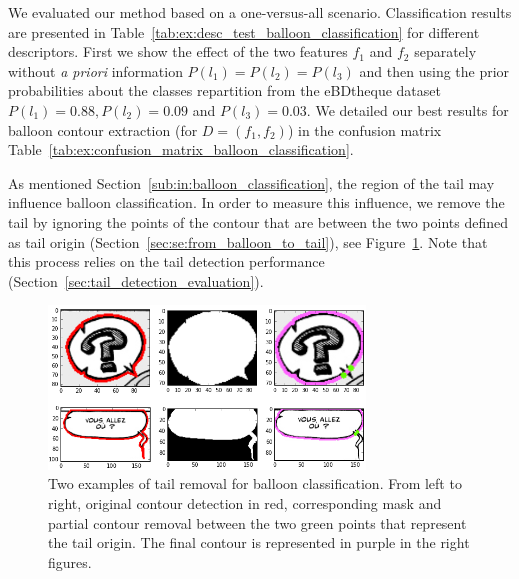 We evaluated our method based on a one-versus-all scenario.
Classification results are presented in Table~\ref{tab:ex:desc_test_balloon_classification} for different descriptors.
First we show the effect of the two features $f_1$ and $f_2$ separately without \emph{a priori} information $P(l_1)=P(l_2)=P(l_3)$ and then using the prior probabilities about the classes repartition from the eBDtheque dataset $P(l_1)=0.88, P(l_2)= 0.09$ and $P(l_3)=0.03$.
We detailed our best results for balloon contour extraction (for $D=(f_1, f_2)$) in the confusion matrix Table~\ref{tab:ex:confusion_matrix_balloon_classification}.

As mentioned Section~\ref{sub:in:balloon_classification}, the region of the tail may influence balloon classification.
In order to measure this influence, we remove the tail by ignoring the points of the contour that are between the two points defined as tail origin (Section~\ref{sec:se:from_balloon_to_tail}), see Figure~\ref{fig:ex:tail_removal}.
Note that this process relies on the tail detection performance (Section~\ref{sec:tail_detection_evaluation}).

   \begin{figure}[!ht]  %
     \centering
    \includegraphics[trim= 0px 0px 0px 0px, clip, width=0.75\textwidth]{tail_removal.png}
    \caption[Tail removal for balloon classification]{Two examples of tail removal for balloon classification. From left to right, original contour detection in red, corresponding mask and partial contour removal between the two green points that represent the tail origin. The final contour is represented in purple in the right figures.}
    \label{fig:ex:tail_removal}
   \end{figure}


